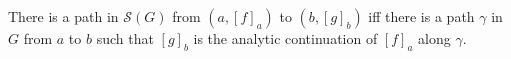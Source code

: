 There is a path in $\mathcal{S}(G)$ from $(a, [f]_a)$ to $(b, [g]_b)$ iff there is a path $\gamma$ in $G$ from $a$ to $b$ such that $[g]_b$ is the analytic continuation of $[f]_a$ along $\gamma$.
